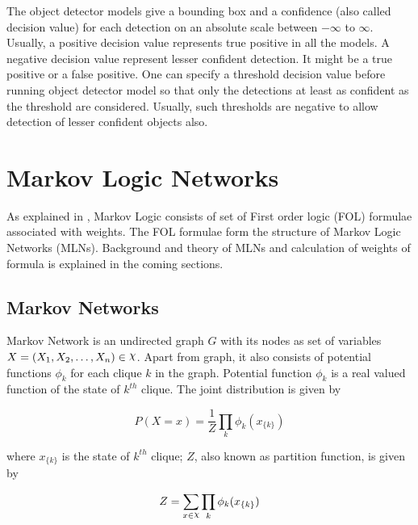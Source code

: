 The object detector models give a bounding box and a confidence (also called decision value) for each detection 
on an absolute scale between $-\infty$ to $\infty$. 
Usually, a positive decision value represents true positive in all the models. 
A negative decision value represent lesser confident detection. 
It might be a true positive or a false positive. 
One can specify a threshold decision value before running object detector model 
so that only the detections at least as confident as the threshold are considered.
Usually, such thresholds are negative to allow detection of lesser confident objects also.

\section{Markov Logic Networks}

\label{section_MLN}


As explained in \cite{MarkovLogic}, Markov Logic consists of set of First order
logic (FOL) formulae associated with weights. The FOL formulae form the structure 
of Markov Logic Networks (MLNs). Background and theory of MLNs and calculation of
weights of formula is explained in the coming sections.

\subsection{Markov Networks}
Markov Network is an undirected graph $G$ with its nodes as set of variables $X = (X_1, X_2,\ldots, X_n) \in \rchi $.
Apart from graph, it also consists of potential functions $\phi_k$ for each clique $k$ in the graph.
Potential function $\phi_k$ is a real valued function of the state of $k^{th}$ clique.
The joint distribution is given by

\begin{equation}
	\label{jointDist}
	P(X = x) = \frac{1}{Z}{\displaystyle \prod_{k} \phi_{k}(x_{\{k\}})}
\end{equation}

where $x_{\{k\}}$ is the state of $k^{th}$ clique;
$Z$, also known as partition function, is given by

\begin{equation}
	\label{partitionFunc}
	Z = \displaystyle \sum_{x \in \rchi} \displaystyle \prod_{k} \phi_k(x_{\{k\}}) 
\end{equation}

